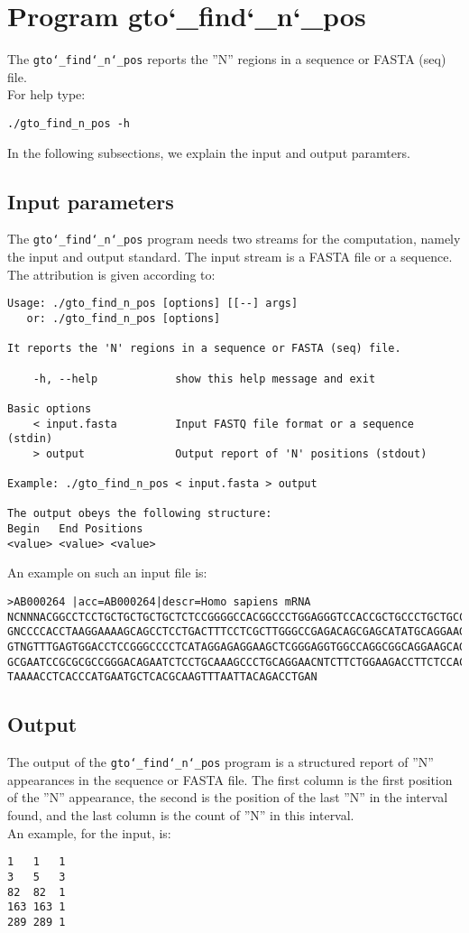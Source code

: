 \section{Program gto\char`_find\char`_n\char`_pos}
The \texttt{gto\char`_find\char`_n\char`_pos} reports the ''N'' regions in a sequence or FASTA (seq) file.\\
For help type:
\begin{lstlisting}
./gto_find_n_pos -h
\end{lstlisting}
In the following subsections, we explain the input and output paramters.

\subsection*{Input parameters}

The \texttt{gto\char`_find\char`_n\char`_pos} program needs two streams for the computation,
namely the input and output standard. The input stream is a FASTA file or a sequence.\\
The attribution is given according to:
\begin{lstlisting}
Usage: ./gto_find_n_pos [options] [[--] args]
   or: ./gto_find_n_pos [options]

It reports the 'N' regions in a sequence or FASTA (seq) file.

    -h, --help            show this help message and exit

Basic options
    < input.fasta         Input FASTQ file format or a sequence (stdin)
    > output              Output report of 'N' positions (stdout)

Example: ./gto_find_n_pos < input.fasta > output

The output obeys the following structure:
Begin	End	Positions
<value>	<value>	<value>
\end{lstlisting}
An example on such an input file is:
\begin{lstlisting}
>AB000264 |acc=AB000264|descr=Homo sapiens mRNA 
NCNNNACGGCCTCCTGCTGCTGCTGCTCTCCGGGGCCACGGCCCTGGAGGGTCCACCGCTGCCCTGCTGCCATTGTCCCC
GNCCCCACCTAAGGAAAAGCAGCCTCCTGACTTTCCTCGCTTGGGCCGAGACAGCGAGCATATGCAGGAAGCGGCAGGAA
GTNGTTTGAGTGGACCTCCGGGCCCCTCATAGGAGAGGAAGCTCGGGAGGTGGCCAGGCGGCAGGAAGCAGGCCAGTGCC
GCGAATCCGCGCGCCGGGACAGAATCTCCTGCAAAGCCCTGCAGGAACNTCTTCTGGAAGACCTTCTCCACCCCCCCAGC
TAAAACCTCACCCATGAATGCTCACGCAAGTTTAATTACAGACCTGAN
\end{lstlisting}

\subsection*{Output}
The output of the \texttt{gto\char`_find\char`_n\char`_pos} program is a structured report of ''N'' appearances in the sequence or FASTA file. The first column is the first position of the ''N'' appearance, the second is the position of the last ''N'' in the interval found, and the last column is the count of ''N'' in this interval. \\
An example, for the input, is:
\begin{lstlisting}
1	1	1
3	5	3
82	82	1
163	163	1
289	289	1
\end{lstlisting}
